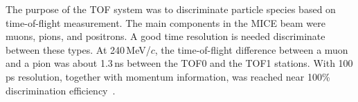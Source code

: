 

The purpose of the TOF system was to discriminate particle species
based on time-of-flight measurement. The main components in the
MICE beam were muons, pions, and positrons.
A good time resolution is needed discriminate between these types.
At 240\,MeV/$c$, the time-of-flight difference between a muon and
a pion was about 1.3\,ns between the TOF0 and the TOF1 stations. With 100\,ps
resolution, together with momentum information, was reached near 100\% discrimination efficiency~\cite{Bogomilov:2012sr}.



